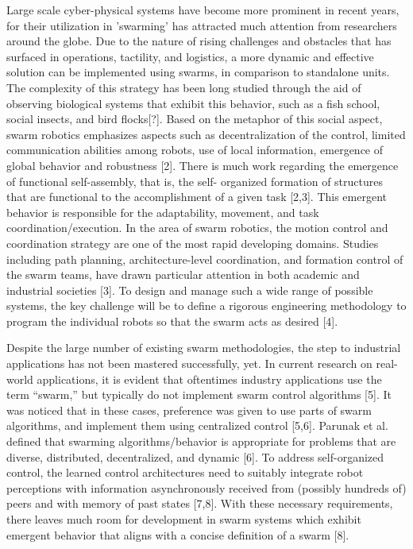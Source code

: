 Large scale cyber-physical systems have become more prominent in recent years, for their utilization in ’swarming’ has attracted much attention from researchers around the globe. Due to the nature of rising challenges and obstacles that has surfaced in operations, tactility, and logistics, a more dynamic and effective solution can be implemented using swarms, in comparison to standalone units. The complexity of this strategy has been long studied through the aid of observing biological systems that exhibit this behavior, such as a fish school, social insects, and bird flocks[?]. Based on the metaphor of this social aspect, swarm robotics emphasizes aspects such as decentralization of the control, limited communication abilities among robots, use of local information, emergence of global behavior and robustness [2]. There is much work regarding the emergence of functional self-assembly, that is, the self- organized formation of structures that are functional to the accomplishment of a given task [2,3]. This emergent behavior is responsible for the adaptability, movement, and task coordination/execution. In the area of swarm robotics, the motion control and coordination strategy are one of the most rapid developing domains. Studies including path planning, architecture-level coordination, and formation control of the swarm teams, have drawn particular attention in both academic and industrial societies [3]. To design and manage such a wide range of possible systems, the key challenge will be to define a rigorous engineering methodology to program the individual robots so that the swarm acts as desired [4]. 


Despite the large number of existing swarm methodologies, the step to industrial applications has not been mastered successfully, yet. In current research on real-world applications, it is evident that oftentimes industry applications use the term “swarm,” but typically do not implement swarm control algorithms [5]. It was noticed that in these cases, preference was given to use parts of swarm algorithms, and implement them using centralized control [5,6]. Parunak et al. defined that swarming algorithms/behavior is appropriate for problems that are diverse, distributed, decentralized, and dynamic [6]. To address self-organized control, the learned control architectures need to suitably integrate robot perceptions with information asynchronously received from (possibly hundreds of) peers and with memory of past states [7,8]. With these necessary requirements, there leaves much room for development in swarm systems which exhibit emergent behavior that aligns with a concise definition of a swarm [8]. 


